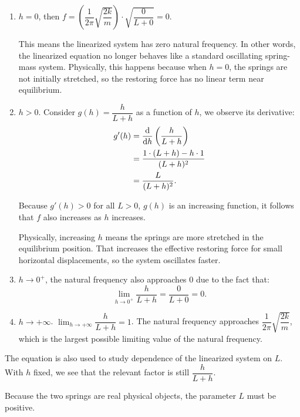 \documentclass[12pt, a4paper]{report}
\renewcommand{\eqref}[1]{\originaleqref{#1}}
\begin{document}
	\begin{enumerate}[label=\textbf{Case \arabic*:}]
		\item $h = 0$, then $f = \left(\dfrac{1}{2\pi} \sqrt{\dfrac{2k}{m}}\right) \cdot \sqrt{\dfrac{0}{L + 0}} = 0.$ 
		
		This means the linearized system has zero natural frequency. In other words, the linearized equation no longer behaves like a standard oscillating spring-mass system. Physically, this happens because when $h = 0$, the springs are not initially stretched, so the restoring force has no linear term near equilibrium.
		
		\item $h > 0$. Consider $g(h) = \dfrac{h}{L + h}$ as a function of $h$, we observe its derivative:
		\begin{align*}
			g'(h) &= \odv*{\left(\dfrac{h}{L + h}\right)}{h} \\
			&= \frac{1 \cdot (L + h) - h \cdot 1}{(L + h)^2} \\
			&= \frac{L}{(L + h)^2}.
		\end{align*}
		
		Because $g'(h) > 0$ for all $L > 0$, $g(h)$ is an increasing function, it follows that $f$ also increases as $h$ increases.
		
		Physically, increasing $h$ means the springs are more stretched in the equilibrium position. That increases the effective restoring force for small horizontal displacements, so the system oscillates faster.
		
		\item $h \to 0^+$, the natural frequency also approaches $0$ due to the fact that:
		\begin{equation*}
			\lim_{h \to 0^+} \dfrac{h}{L + h} = \dfrac{0}{L + 0} = 0.
		\end{equation*}
		
		\item $h \to +\infty$. $\displaystyle \lim_{h \to +\infty} \dfrac{h}{L + h} = 1$. The natural frequency approaches $\dfrac{1}{2\pi} \sqrt{\dfrac{2k}{m}}$, which is the largest possible limiting value of the natural frequency. \\
	\end{enumerate}
	
	The equation \eqref{eq:problem2:frequency_grouped} is also used to study dependence of the linearized system on $L$. With $h$ fixed, we see that the relevant factor is still $\dfrac{h}{L + h}$.
	
	Because the two springs are real physical objects, the parameter $L$ must be positive.
	
\end{document}
